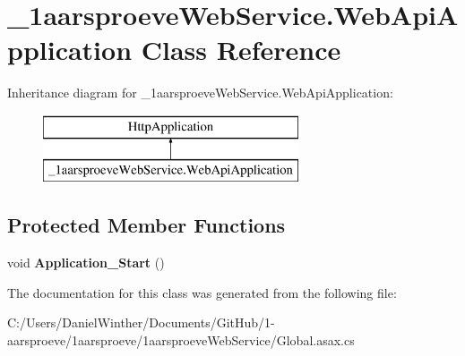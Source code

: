 \hypertarget{class__1aarsproeve_web_service_1_1_web_api_application}{}\section{\+\_\+1aarsproeve\+Web\+Service.\+Web\+Api\+Application Class Reference}
\label{class__1aarsproeve_web_service_1_1_web_api_application}
Inheritance diagram for \+\_\+1aarsproeve\+Web\+Service.\+Web\+Api\+Application\+:\begin{figure}[H]
\begin{center}
\leavevmode
\includegraphics[height=2.000000cm]{class__1aarsproeve_web_service_1_1_web_api_application}
\end{center}
\end{figure}
\subsection*{Protected Member Functions}
\begin{DoxyCompactItemize}
\item 
\hypertarget{class__1aarsproeve_web_service_1_1_web_api_application_a4df9555d507ebda395e42ae2f0b20acf}{}void {\bfseries Application\+\_\+\+Start} ()\label{class__1aarsproeve_web_service_1_1_web_api_application_a4df9555d507ebda395e42ae2f0b20acf}

\end{DoxyCompactItemize}


The documentation for this class was generated from the following file\+:\begin{DoxyCompactItemize}
\item 
C\+:/\+Users/\+Daniel\+Winther/\+Documents/\+Git\+Hub/1-\/aarsproeve/1aarsproeve/1aarsproeve\+Web\+Service/Global.\+asax.\+cs\end{DoxyCompactItemize}
